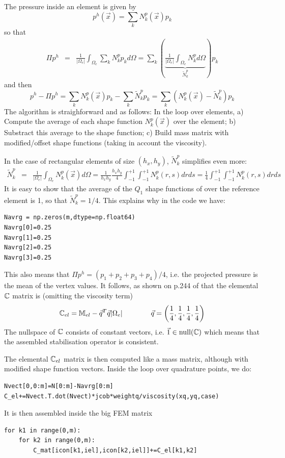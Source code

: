 The pressure inside an element is given by 
\[
p^h(\vec x) = \sum_k N_k^p(\vec x) p_k
\]
so that 
\begin{eqnarray}
\Pi p^h 
&=& \frac{1}{|\Omega_e|} \int_{\Omega_e} \sum_k N_k^p p_k d\Omega 
= \sum_k \left(\underbrace{\frac{1}{|\Omega_e|} \int_{\Omega_e} N_k^p  d\Omega}_{\tilde{N}_k^p} \right) p_k
\end{eqnarray}
and then
\[
p^h -\Pi p^h 
= \sum_k N_k^p(\vec x) p_k - \sum_k \tilde{N}_k^p p_k  
= \sum_k (N_k^p(\vec x) - \tilde{N}_k^p) p_k  
\]
The algorithm is straighforward and as follows:
In the loop over elements, a) Compute the average of each shape function $N_k^p(\vec x)$ over the element;
b) Substract this average to the shape function; c) Build mass matrix with modified/offset shape functions
(taking in account the viscosity).
 
In the case of rectangular elements of size $(h_x,h_y)$, $\tilde{N}_k^p$ simplifies even more:
\begin{eqnarray}
\tilde{N}_k^p 
&=& \frac{1}{|\Omega_e|} \int_{\Omega_e} N_k^p(\vec x)   d\Omega  
= \frac{1}{h_xh_y} \frac{h_xh_y}{4} \int_{-1}^{+1} \int_{-1}^{+1} N_k^p(r,s)   drds 
= \frac{1}{4} \int_{-1}^{+1} \int_{-1}^{+1} N_k^p(r,s)   drds 
\end{eqnarray}
It is easy to show that the average of the $Q_1$ shape functions of over the reference 
element is 1, so that $ \tilde{N}_k^p=1/4$. 
This explains why in the code we have:
\begin{lstlisting}
Navrg = np.zeros(m,dtype=np.float64)
Navrg[0]=0.25
Navrg[1]=0.25
Navrg[2]=0.25
Navrg[3]=0.25
\end{lstlisting}
This also means that $\Pi p^h = (p_1+p_2+p_3+p_4)/4$, i.e. the projected pressure
is the mean of the vertex values. It follows, as shown on p.244 of \cite{elsw} that 
the elemental ${\mathbb{C}}$ matrix is (omitting the viscosity term)
\[
{\mathbb{C}}_{el} = \mathbb{M}_{el} - \vec q^T \vec q |\Omega_e| \qquad\qquad 
\vec q=\left(\frac{1}{4},\frac{1}{4},\frac{1}{4},\frac{1}{4} \right)
\]
The nullspace of ${\mathbb{C}}$ consists of constant vectors, i.e. $\vec 1 \in \text{null}({\mathbb{C}})$ which means
that the assembled stabilisation operator is consistent.

The elemental ${\mathbb{C}}_{el}$ matrix is then computed like a mass matrix, although with modified 
shape function vectors. Inside the loop over quadrature points, we do:
\begin{lstlisting}
Nvect[0,0:m]=N[0:m]-Navrg[0:m]
C_el+=Nvect.T.dot(Nvect)*jcob*weightq/viscosity(xq,yq,case)
\end{lstlisting}
It is then assembled inside the big FEM matrix 
\begin{lstlisting}
for k1 in range(0,m):
    for k2 in range(0,m):
        C_mat[icon[k1,iel],icon[k2,iel]]+=C_el[k1,k2] 
\end{lstlisting}



